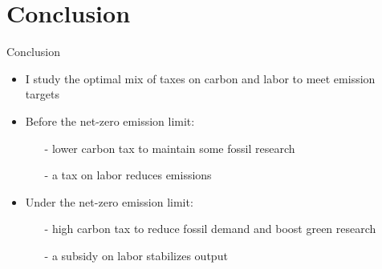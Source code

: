 \documentclass[11pt,aspectratio=169]{beamer}
\begin{document}
\section{Conclusion}
\begin{frame}{Conclusion}
	\begin{itemize}[<+-| alert@+>]
		\item I study the optimal mix of taxes on carbon and labor to meet emission targets
		\vspace{3mm}
		\item Before the net-zero emission limit: 
		\begin{itemize}
			\item[-] lower carbon tax to maintain some fossil research
			\item[-] a tax on labor reduces emissions
		\end{itemize}
		\vspace{3mm}
	\item Under the net-zero emission limit: 
	\begin{itemize}
		\item[-]  high carbon tax to reduce fossil demand and boost green research
		\item[-]  a subsidy on labor stabilizes output
	\end{itemize}
	\end{itemize}
\end{frame}


%
\end{document}
